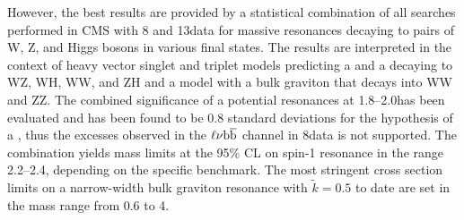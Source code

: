 However, the best results are provided by a statistical combination of all searches performed in CMS with 8 and 13\TeV data for massive resonances decaying to pairs of W, Z, and Higgs bosons in various final states.
The results are interpreted in the context of heavy vector singlet and triplet models predicting a \Wpr and a \Zpr decaying to WZ, WH, WW, and ZH and a model with a bulk graviton that decays into WW and ZZ.
The combined significance of a potential resonances at 1.8--2.0\TeV has been evaluated and has been found to be 0.8 standard deviations for the hypothesis of a \Wpr,
thus the excesses observed in the $\ell\nu{\mathrm{b}\overline{\mathrm{b}}}$ channel in 8\TeV data is not supported.
The combination yields mass limits at the 95\% CL on spin-1 resonance in the range 2.2--2.4\TeV, depending on the specific benchmark.
The most stringent cross section limits on a narrow-width bulk graviton resonance with $\tilde{k} = 0.5$ to date are set in the mass range from 0.6 to 4\TeV.
